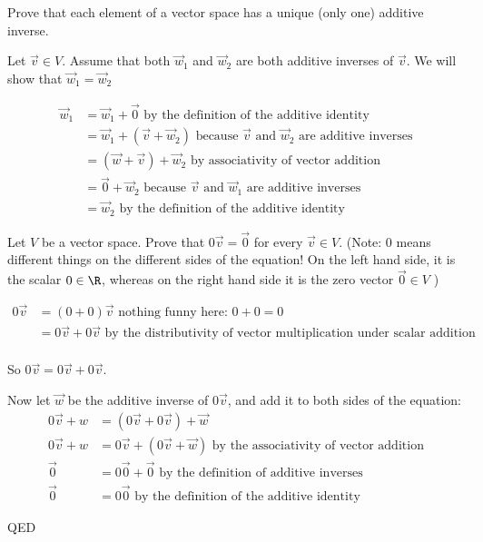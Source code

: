 \documentclass{ximera}
\begin{document}
	
		Prove that each element of a vector space has a unique (only one) additive inverse.
	\begin{free-response}
		Let $\vec{v} \in V$.  Assume that both $\vec{w}_1$ and $\vec{w}_2$ are both additive inverses of $\vec{v}$.  We will show that $\vec{w}_1=\vec{w}_2$
		
		\begin{align*}
			\vec{w}_1&= \vec{w}_1+\vec{0} \text{ by the definition of the additive identity}\\
			   &= \vec{w}_1+\left(\vec{v}+ \vec{w}_2\right) \text{ because $\vec{v}$ and $\vec{w}_2$ are additive inverses}\\
			   &=\left( \vec{w}+\vec{v}\right)+\vec{w}_2 \text{ by associativity of vector addition}\\
			   &= \vec{0}+\vec{w}_2 \text{ because $\vec{v}$ and $\vec{w}_1$ are additive inverses}\\
			   &= \vec{w}_2 \text{ by the definition of the additive identity}
 		\end{align*}
	\end{free-response}
	
	
		Let $V$ be a vector space. Prove that $0\vec{v} = \vec{0}$ for every $\vec{v} \in V$. (Note: $0$ means different things on the different sides of the equation!  On
		the left hand side, it is the scalar $0\in\R$, whereas on the right hand side it is the zero vector $\vec{0} \in V$ )
		
		\begin{free-response}
			
			\begin{align*}
				0\vec{v} &= (0+0)\vec{v} \text{ nothing funny here:  $0+0=0$}\\
							&=0\vec{v}+0\vec{v} \text{ by the distributivity of vector multiplication under scalar addition}\\
			\end{align*}
			
			So $0\vec{v} = 0\vec{v}+0\vec{v}$.
			
			Now let $\vec{w}$ be the additive inverse of $0\vec{v}$, and add it to both sides of the equation:
			\begin{align*}
			0\vec{v}+w &= \left(0\vec{v}+0\vec{v} \right) + \vec{w}\\
			0\vec{v}+w & = 0\vec{v}+\left( 0\vec{v} +\vec{w}\right) \text{ by the associativity of vector addition}\\
			\vec{0} &= 0\vec{0}+\vec{0} \text{ by the definition of additive inverses}\\
			\vec{0}&= 0\vec{0} \text{ by the definition of the additive identity}
			\end{align*}
			
			QED
		\end{free-response}
	
\end{document}
